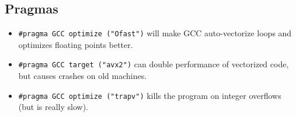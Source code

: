 	\subsection{Pragmas}
		\begin{itemize}
			\item \lstinline{#pragma GCC optimize ("Ofast")} will make GCC auto-vectorize loops and optimizes floating points better.
			\item \lstinline{#pragma GCC target ("avx2")} can double performance of vectorized code, but causes crashes on old machines.
			\item \lstinline{#pragma GCC optimize ("trapv")} kills the program on integer overflows (but is really slow).
		\end{itemize}
